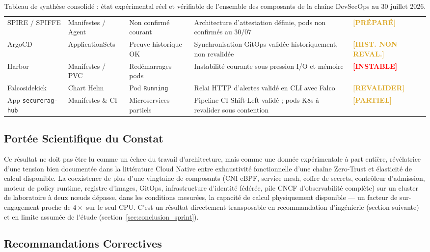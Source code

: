 \begin{table}[H]
\begin{tabular}{@{}p{2.8cm}p{2.2cm}p{2.2cm}p{4.8cm}p{1.8cm}@{}}
SPIRE / SPIFFE & Manifestes / Agent & Non confirmé courant & Architecture d'attestation définie, pods non confirmés au 30/07 & \textcolor{Goldenrod}{\textbf{[PRÉPARÉ]}} \\
ArgoCD & ApplicationSets & Preuve historique OK & Synchronisation GitOps validée historiquement, non revalidée & \textcolor{Goldenrod}{\textbf{[HIST. NON REVAL.]}} \\
Harbor & Manifestes / PVC & Redémarrages pods & Instabilité courante sous pression I/O et mémoire & \textcolor{red}{\textbf{[INSTABLE]}} \\
Falcosidekick & Chart Helm & Pod \texttt{Running} & Relai HTTP d'alertes validé en CLI avec Falco & \textcolor{Goldenrod}{\textbf{[REVALIDER]}} \\
App \texttt{securerag-hub} & Manifestes \& CI & Microservices partiels & Pipeline CI Shift-Left validé ; pods K8s à revalider sous contention & \textcolor{Goldenrod}{\textbf{[PARTIEL]}} \\
\bottomrule
\end{tabular}
\caption{Tableau de synthèse consolidé : état expérimental réel et vérifiable de l'ensemble des composants de la chaîne DevSecOps au 30 juillet 2026.}
\label{tab:etat_execution_consolide}
\end{table}

\subsection{Portée Scientifique du Constat}

Ce résultat ne doit pas être lu comme un échec du travail d'architecture, mais comme une donnée expérimentale à part entière, révélatrice d'une tension bien documentée dans la littérature Cloud Native entre exhaustivité fonctionnelle d'une chaîne Zero-Trust et élasticité de calcul disponible. La coexistence de plus d'une vingtaine de composants (CNI eBPF, service mesh, coffre de secrets, contrôleur d'admission, moteur de policy runtime, registre d'images, GitOps, infrastructure d'identité fédérée, pile CNCF d'observabilité complète) sur un cluster de laboratoire à deux nœuds dépasse, dans les conditions mesurées, la capacité de calcul physiquement disponible — un facteur de sur-engagement proche de $4\times$ sur le seul CPU. C'est un résultat directement transposable en recommandation d'ingénierie (section suivante) et en limite assumée de l'étude (section~\ref{sec:conclusion_sprint}).

\subsection{Recommandations Correctives}

